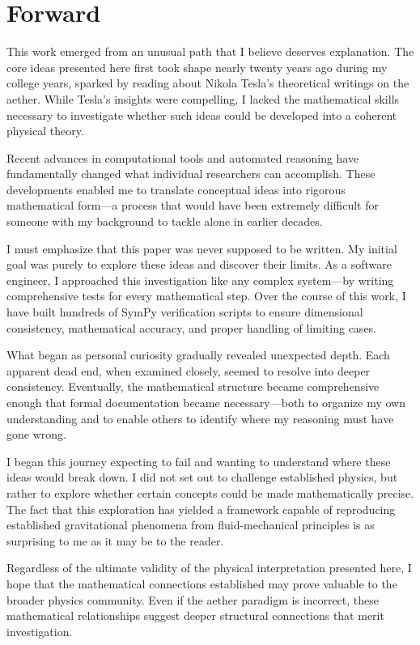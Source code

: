 \section*{Forward}

This work emerged from an unusual path that I believe deserves explanation. The core ideas presented here first took shape nearly twenty years ago during my college years, sparked by reading about Nikola Tesla's theoretical writings on the aether. While Tesla's insights were compelling, I lacked the mathematical skills necessary to investigate whether such ideas could be developed into a coherent physical theory.

Recent advances in computational tools and automated reasoning have fundamentally changed what individual researchers can accomplish. These developments enabled me to translate conceptual ideas into rigorous mathematical form—a process that would have been extremely difficult for someone with my background to tackle alone in earlier decades.

I must emphasize that this paper was never supposed to be written. My initial goal was purely to explore these ideas and discover their limits. As a software engineer, I approached this investigation like any complex system—by writing comprehensive tests for every mathematical step. Over the course of this work, I have built hundreds of SymPy verification scripts to ensure dimensional consistency, mathematical accuracy, and proper handling of limiting cases.

What began as personal curiosity gradually revealed unexpected depth. Each apparent dead end, when examined closely, seemed to resolve into deeper consistency. Eventually, the mathematical structure became comprehensive enough that formal documentation became necessary—both to organize my own understanding and to enable others to identify where my reasoning must have gone wrong.

I began this journey expecting to fail and wanting to understand where these ideas would break down. I did not set out to challenge established physics, but rather to explore whether certain concepts could be made mathematically precise. The fact that this exploration has yielded a framework capable of reproducing established gravitational phenomena from fluid-mechanical principles is as surprising to me as it may be to the reader.

Regardless of the ultimate validity of the physical interpretation presented here, I hope that the mathematical connections established may prove valuable to the broader physics community. Even if the aether paradigm is incorrect, these mathematical relationships suggest deeper structural connections that merit investigation.

